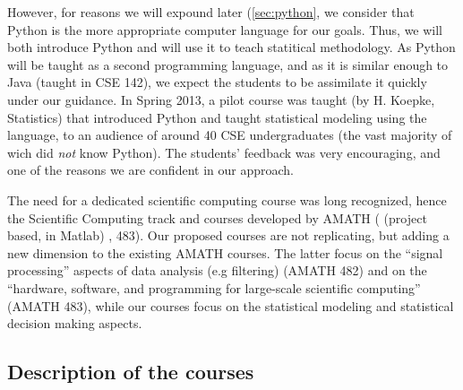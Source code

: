 However, for reasons we will expound later (\ref{sec:python}, we
consider that Python is the more appropriate computer language for our
goals. Thus, we will both introduce Python and will use it to teach
statitical methodology.  As Python will be taught as a second
programming language, and as it is similar enough to Java (taught in
CSE 142), we expect the students to be assimilate it quickly under our
guidance. In Spring 2013, a pilot course was taught (by H. Koepke,
Statistics) that introduced Python and taught statistical modeling
using the language, to an audience of around 40 CSE undergraduates
(the vast majority of wich did {\em not} know Python). The students'
feedback was very encouraging, and one of the reasons we are confident
in our approach.

The need for a dedicated scientific computing course was long
recognized, hence the Scientific Computing track and courses developed
by AMATH ({} (project based, in Matlab) {, 483}). Our
proposed courses are not replicating, but adding a new dimension to
the existing AMATH courses. The latter focus on the ``signal
processing'' aspects of data analysis (e.g filtering) ({\sc AMATH
  482}) and on the ``hardware, software, and programming for
large-scale scientific computing'' ({\sc AMATH 483}), while our
courses focus on the statistical modeling and statistical decision
making aspects.
 

\subsection{Description of the courses}
\label{sec:course-descr}

